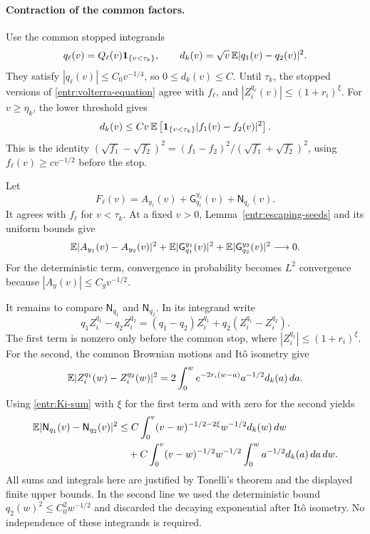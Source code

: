 \paragraph{Contraction of the common factors.}
Use the common stopped integrands
\[
 q_\ell(v)=Q_\ell(v)\mathbf 1_{\{v<\tau_k\}},\qquad
 d_k(v)=\sqrt v\,\mathbb E|q_1(v)-q_2(v)|^2.
\]
They satisfy \(|q_\ell(v)|\le C_0v^{-1/4}\), so \(0\le d_k(v)\le C\).
Until \(\tau_k\), the stopped versions of
\eqref{entr:volterra-equation} agree with \(f_\ell\), and
\(|Z_i^{q_\ell}(v)|\le(1+r_i)^\xi\).
For \(v\ge\eta_k\), the lower threshold gives
\begin{equation}\label{entr:sqrt-difference}
 d_k(v)\le C v\,\mathbb E\left[
       \mathbf 1_{\{v<\tau_k\}}|f_1(v)-f_2(v)|^2\right].
\end{equation}
This is the identity
\((\sqrt{f_1}-\sqrt{f_2})^2=(f_1-f_2)^2/
(\sqrt{f_1}+\sqrt{f_2})^2\), using
\(f_\ell(v)\ge c v^{-1/2}\) before the stop.

Let
\[
 F_\ell(v)=A_{y_\ell}(v)
       +\mathsf G_{q_\ell}^{y_\ell}(v)+\mathsf N_{q_\ell}(v).
\]
It agrees with \(f_\ell\) for \(v<\tau_k\).  At a fixed \(v>0\),
Lemma~\ref{entr:escaping-seeds} and its uniform bounds give
\begin{equation}\label{entr:seed-vanishes}
 \mathbb E|A_{y_1}(v)-A_{y_2}(v)|^2
  +\mathbb E|\mathsf G_{q_1}^{y_1}(v)|^2
  +\mathbb E|\mathsf G_{q_2}^{y_2}(v)|^2\longrightarrow0 .
\end{equation}
For the deterministic term, convergence in probability becomes
\(L^2\) convergence because \(|A_y(v)|\le C_gv^{-1/2}\).

It remains to compare \(\mathsf N_{q_1}\) and \(\mathsf N_{q_2}\).
In its integrand write
\[
 q_1Z_i^{q_1}-q_2Z_i^{q_2}
   =(q_1-q_2)Z_i^{q_1}+q_2(Z_i^{q_1}-Z_i^{q_2}).
\]
The first term is nonzero only before the common stop, where
\(|Z_i^{q_1}|\le(1+r_i)^\xi\).  For the second, the common
Brownian motions and Itô isometry give
\[
 \mathbb E|Z_i^{q_1}(w)-Z_i^{q_2}(w)|^2
 =2\int_0^w e^{-2r_i(w-a)}a^{-1/2}d_k(a)\,da .
\]
Using \eqref{entr:Ki-sum} with \(\xi\) for the first term and
with zero for the second yields
\begin{align}
 \mathbb E|\mathsf N_{q_1}(v)-\mathsf N_{q_2}(v)|^2
 &\le C\int_0^v (v-w)^{-1/2-2\xi}w^{-1/2}d_k(w)\,dw\notag\\
 &\quad+C\int_0^v (v-w)^{-1/2}w^{-1/2}
                 \int_0^w a^{-1/2}d_k(a)\,da\,dw .
                                                        \label{entr:contraction-integrals}
\end{align}
All sums and integrals here are justified by Tonelli's theorem and
the displayed finite upper bounds.  In the second line we used the
deterministic bound \(q_2(w)^2\le C_0^2w^{-1/2}\) and discarded
the decaying exponential after Itô isometry.  No independence of
these integrands is required.

